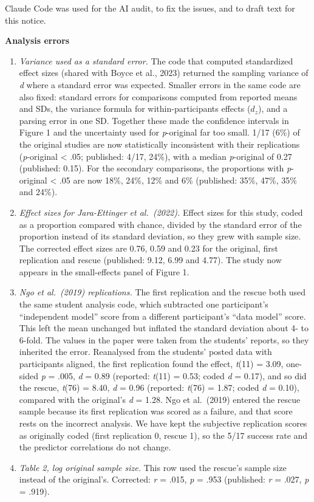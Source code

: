 \documentclass[
  english,
  a4paper,
]{article}
\providecommand{\tightlist}{%
  \setlength{\itemsep}{0pt}\setlength{\parskip}{0pt}}
\begin{document}
Claude Code was used for the AI audit, to fix the issues, and to draft text for this notice.

\textbf{Analysis errors}

\begin{enumerate}
\def\labelenumi{\arabic{enumi}.}
\tightlist
\item
  \emph{Variance used as a standard error.} The code that computed standardized effect sizes (shared with Boyce et al., 2023) returned the sampling variance of \emph{d} where a standard error was expected. Smaller errors in the same code are also fixed: standard errors for comparisons computed from reported means and SDs, the variance formula for within-participants effects (\(d_z\)), and a parsing error in one SD. Together these made the confidence intervals in Figure 1 and the uncertainty used for \emph{p}-original far too small. 1/17 (6\%) of the original studies are now statistically inconsistent with their replications (\emph{p}-original \textless{} .05; published: 4/17, 24\%), with a median \emph{p}-original of 0.27 (published: 0.15). For the secondary comparisons, the proportions with \emph{p}-original \textless{} .05 are now 18\%, 24\%, 12\% and 6\% (published: 35\%, 47\%, 35\% and 24\%).
\item
  \emph{Effect sizes for Jara-Ettinger et al.~(2022).} Effect sizes for this study, coded as a proportion compared with chance, divided by the standard error of the proportion instead of its standard deviation, so they grew with sample size. The corrected effect sizes are 0.76, 0.59 and 0.23 for the original, first replication and rescue (published: 9.12, 6.99 and 4.77). The study now appears in the small-effects panel of Figure 1.
\item
  \emph{Ngo et al.~(2019) replications.} The first replication and the rescue both used the same student analysis code, which subtracted one participant's ``independent model'' score from a different participant's ``data model'' score. This left the mean unchanged but inflated the standard deviation about 4- to 6-fold. The values in the paper were taken from the students' reports, so they inherited the error. Reanalysed from the students' posted data with participants aligned, the first replication found the effect, \emph{t}(11) = 3.09, one-sided \emph{p} = .005, \emph{d} = 0.89 (reported: \emph{t}(11) = 0.53; coded \emph{d} = 0.17), and so did the rescue, \emph{t}(76) = 8.40, \emph{d} = 0.96 (reported: \emph{t}(76) = 1.87; coded \emph{d} = 0.10), compared with the original's \emph{d} = 1.28. Ngo et al.~(2019) entered the rescue sample because its first replication was scored as a failure, and that score rests on the incorrect analysis. We have kept the subjective replication scores as originally coded (first replication 0, rescue 1), so the 5/17 success rate and the predictor correlations do not change.
\item
  \emph{Table 2, log original sample size.} This row used the rescue's sample size instead of the original's. Corrected: \emph{r} = .015, \emph{p} = .953 (published: \emph{r} = .027, \emph{p} = .919).
\end{enumerate}
\end{document}
